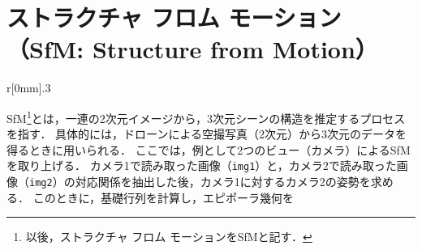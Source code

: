 \section{ストラクチャ フロム モーション（SfM: Structure from Motion）}
\begin{wrapfigure}{r}[0mm]{.3\textwidth}
    \centering
    \vspace{-.5cm}
\end{wrapfigure}
SfM\footnote{以後，ストラクチャ フロム モーションをSfMと記す．}とは，一連の2次元イメージから，3次元シーンの構造を推定するプロセスを指す．
具体的には，ドローンによる空撮写真（2次元）から3次元のデータを得るときに用いられる．
ここでは，例として2つのビュー（カメラ）によるSfMを取り上げる．
カメラ1で読み取った画像（\texttt{img1}）と，カメラ2で読み取った画像（\texttt{img2}）の対応関係を抽出した後，カメラ1に対するカメラ2の姿勢を求める．
このときに，基礎行列を計算し，エピポーラ幾何を
